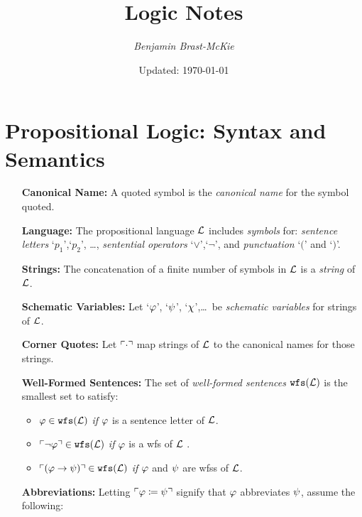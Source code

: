 \documentclass[a4paper, 11pt]{article} %
\title{\textbf{Logic Notes}} %
\author{\em Benjamin Brast-McKie} %
\date{Updated: \today} %
\makeatletter
\renewcommand{\maketitle}{ %
\begin{flushright} %
{\@date\hfill \LARGE\@title} %

\vspace{5pt} %

{\@author} %

\end{flushright}
}
\makeatother
\begin{document}
\maketitle %
\thispagestyle{empty}



\section*{\sc Propositional Logic: Syntax and Semantics}

\begin{enumerate}[leftmargin=1.2in,labelsep=.15in] %
  \item[\bf Canonical Name:] A quoted symbol is the \textit{canonical name} for the symbol quoted.
  \item[\bf Language:] The propositional language $\mathcal{L}$ includes \textit{symbols} for: \textit{sentence letters} `$p_1$',`$p_2$', \dots, \textit{sentential operators} `$\vee$',`$\neg$', and \textit{punctuation} `$($' and `$)$'.
  \item[\bf Strings:] The concatenation of a finite number of symbols in $\mathcal{L}$ is a \textit{string} of $\mathcal{L}$.
  \item[\bf Schematic Variables:] Let `$\varphi$', `$\psi$', `$\chi$',\ldots\ be \textit{schematic variables} for strings of $\mathcal{L}$.
  \item[\bf Corner Quotes:] Let $\ulcorner\cdot\urcorner$ map strings of $\mathcal{L}$ to the canonical names for those strings.
  \item[\bf Well-Formed Sentences:] The set of \textit{well-formed sentences} $\texttt{wfs}(\mathcal{L})$ is the smallest set to satisfy:
    \begin{itemize}\small
      \item $\varphi \in \texttt{wfs}(\mathcal{L})$ \textit{if} $\varphi$ is a sentence letter of $\mathcal{L}$. 
      \item $\ulcorner\neg \varphi\urcorner \in \texttt{wfs}(\mathcal{L})$ \textit{if} $\varphi$ is a wfs of $\mathcal{L}$ .
      \item $\ulcorner(\varphi \rightarrow \psi)\urcorner \in \texttt{wfs}(\mathcal{L})$ \textit{if} $\varphi$ and $\psi$ are wfss of $\mathcal{L}$.
    \end{itemize}
  \item[\bf Abbreviations:] Letting $\ulcorner\varphi \coloneq \psi\urcorner$ signify that $\varphi$ abbreviates $\psi$, assume the following:

\end{enumerate}
\end{document}
